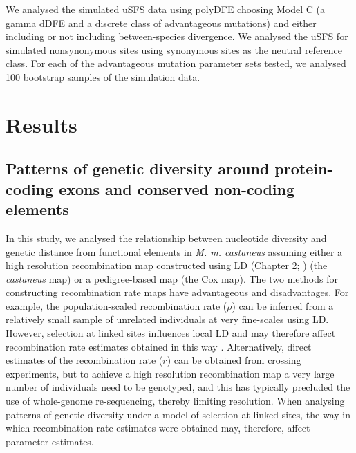 	 We analysed the simulated uSFS data using polyDFE choosing Model C (a gamma dDFE and a discrete class of advantageous mutations) and either including or not including between-species divergence. We analysed the uSFS for simulated nonsynonymous sites using synonymous sites as the neutral reference class. For each of the advantageous mutation parameter sets tested, we analysed 100 bootstrap samples of the simulation data.
 
 	
%
%


\section{Results}

\subsection{Patterns of genetic diversity around protein-coding exons and conserved non-coding elements}


	In this study, we analysed the relationship between nucleotide diversity and genetic distance from functional elements in \textit{M. m. castaneus} assuming either a high resolution recombination map constructed using LD (Chapter 2; \citealt{RN340}) (the \textit{castaneus} map) or a pedigree-based map \citep{RN232} (the Cox map). The two methods for constructing recombination rate maps have advantageous and disadvantages. For example, the population-scaled recombination rate ($\rho$) can be inferred from a relatively small sample of unrelated individuals at very fine-scales using LD. However, selection at linked sites influences local LD and may therefore affect recombination rate estimates obtained in this way \citep{RN370}. Alternatively, direct estimates of the recombination rate ($r$) can be obtained from crossing experiments, but to achieve a high resolution recombination map a very large number of individuals need to be genotyped, and this has typically precluded the use of whole-genome re-sequencing, thereby limiting resolution. When analysing patterns of genetic diversity under a model of selection at linked sites, the way in which recombination rate estimates were obtained may, therefore, affect parameter estimates.

